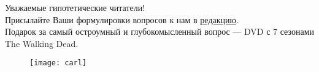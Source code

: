 \subtitle{Задай вопрос Карлу}
Уважаемые гипотетические читатели!\\
Присылайте Ваши формулировки вопросов к нам в \href{https://vk.com/id12023cool}{редакцию}.\\
Подарок за самый остроумный и глубокомысленный вопрос --- DVD с 7 сезонами The Walking Dead.

\begin{figure}[ht!]
    \centering
    \texttt{[image: carl]}
\end{figure}
